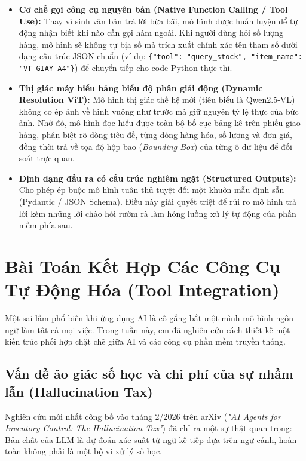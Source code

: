 \documentclass[11pt,a4paper]{article}
\begin{document}
\begin{itemize}
    \item \textbf{Cơ chế gọi công cụ nguyên bản (Native Function Calling / Tool Use):} \newline
    Thay vì sinh văn bản trả lời bừa bãi, mô hình được huấn luyện để tự động nhận biết khi nào cần gọi hàm ngoài. Khi người dùng hỏi số lượng hàng, mô hình sẽ không tự bịa số mà trích xuất chính xác tên tham số dưới dạng cấu trúc JSON chuẩn (ví dụ: \texttt{\{"tool": "query\_stock", "item\_name": "VT-GIAY-A4"\}}) để chuyển tiếp cho code Python thực thi.
    
    \item \textbf{Thị giác máy hiểu bảng biểu độ phân giải động (Dynamic Resolution ViT):} \newline
    Mô hình thị giác thế hệ mới (tiêu biểu là Qwen2.5-VL) không co ép ảnh về hình vuông như trước mà giữ nguyên tỷ lệ thực của bức ảnh. Nhờ đó, mô hình đọc hiểu được toàn bộ bố cục bảng kê trên phiếu giao hàng, phân biệt rõ dòng tiêu đề, từng dòng hàng hóa, số lượng và đơn giá, đồng thời trả về tọa độ hộp bao (\textit{Bounding Box}) của từng ô dữ liệu để đối soát trực quan.

    \item \textbf{Định dạng đầu ra có cấu trúc nghiêm ngặt (Structured Outputs):} \newline
    Cho phép ép buộc mô hình tuân thủ tuyệt đối một khuôn mẫu định sẵn (Pydantic / JSON Schema). Điều này giải quyết triệt để rủi ro mô hình trả lời kèm những lời chào hỏi rườm rà làm hỏng luồng xử lý tự động của phần mềm phía sau.
\end{itemize}

\vspace{0.3cm}

\section{Bài Toán Kết Hợp Các Công Cụ Tự Động Hóa (Tool Integration)}

Một sai lầm phổ biến khi ứng dụng AI là cố gắng bắt một mình mô hình ngôn ngữ làm tất cả mọi việc. Trong tuần này, em đã nghiên cứu cách thiết kế một kiến trúc phối hợp chặt chẽ giữa AI và các công cụ phần mềm truyền thống.

\subsection{Vấn đề ảo giác số học và chi phí của sự nhầm lẫn (Hallucination Tax)}
Nghiên cứu mới nhất công bố vào tháng 2/2026 trên arXiv (\textit{"AI Agents for Inventory Control: The Hallucination Tax"}) đã chỉ ra một sự thật quan trọng: Bản chất của LLM là dự đoán xác suất từ ngữ kế tiếp dựa trên ngữ cảnh, hoàn toàn không phải là một bộ vi xử lý số học. 
\end{document}
